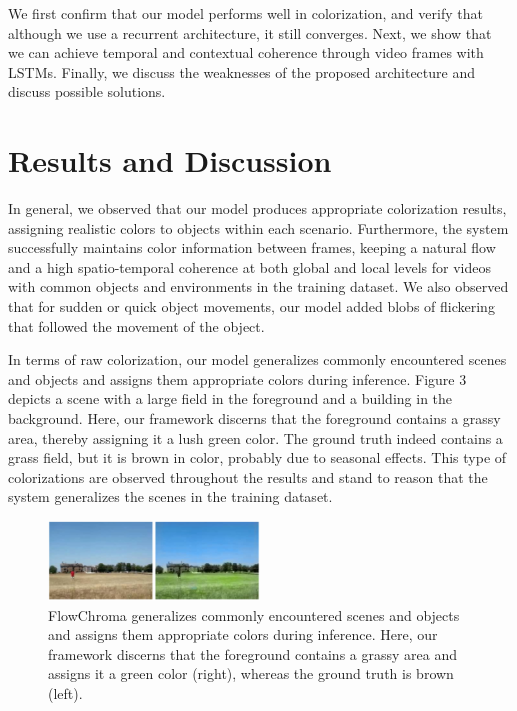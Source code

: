 \documentclass[10pt,twocolumn,letterpaper]{article}
\begin{document}
We first confirm that our model performs well in colorization, and verify that although we use a recurrent architecture, it still converges. Next, we show that we can achieve temporal and contextual coherence through video frames with LSTMs. Finally, we discuss the weaknesses of the proposed architecture and discuss possible solutions.

\section{Results and Discussion}
In general, we observed that our model produces appropriate colorization results, assigning realistic colors to objects within each scenario. Furthermore, the system successfully maintains color information between frames, keeping a natural flow and a high spatio-temporal coherence at both global and local levels for videos with common objects and environments in the training dataset. We also observed that for sudden or quick object movements, our model added blobs of flickering that followed the movement of the object.

In terms of raw colorization, our model generalizes commonly encountered scenes and objects and assigns them appropriate colors during inference. Figure 3 depicts a scene with a large field in the foreground and a building in the background. Here, our framework discerns that the foreground contains a grassy area, thereby assigning it a lush green color. The ground truth indeed contains a grass field, but it is brown in color, probably due to seasonal effects. This type of colorizations are observed throughout the results and stand to reason that the system generalizes the scenes in the training dataset.

\begin{figure}[!h]
  \centering
  \includegraphics[width=0.5\textwidth]{original-fc-grass-building.jpg}
  \caption{FlowChroma generalizes commonly encountered scenes and objects and assigns them appropriate colors during inference. Here, our framework discerns that the foreground contains a grassy area and assigns it a green color (right), whereas the ground truth is brown (left).}
\end{figure}
\end{document}
